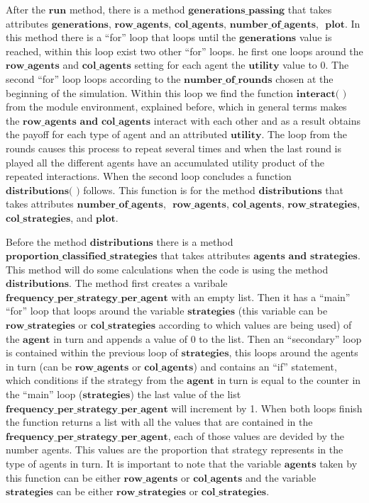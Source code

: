 \documentclass{article}
\begin{document}
After the $\textbf{run}$ method, there is a method $\textbf{generations\_passing}$ that takes attributes $\textbf{generations}$,  $\textbf{row\_agents}$, $\textbf{col\_agents}$, $\textbf{number\_of\_agents}$, $\textbf{ plot}$. In this method there is a ``for'' loop that loops until the $\textbf{generations}$ value is reached, within this loop exist two other ``for'' loops.
 he first one loops around the $\textbf{row\_agents}$ and  $\textbf{col\_agents}$ setting for each agent  the $\textbf{utility}$ value to 0. 
The second ``for'' loop loops according to the $\textbf{number\_of\_rounds}$ chosen at the beginning of the simulation. Within this loop we find the function $\textbf{interact( )}$ from the module environment, explained before, which in general terms makes the $\textbf{row\_agents and col\_agents}$ interact with each other and as a result obtains the payoff for each type of agent and an attributed $\textbf{utility}$. The loop from the rounds causes this process to repeat several times and when the last round is played all the different agents have an accumulated utility product of the repeated interactions.
When the second loop concludes a function $\textbf{distributions( )}$ follows. This function is for the method $\textbf{distributions}$ that takes attributes $\textbf{number\_of\_agents}$, $\textbf{ row\_agents}$, $\textbf{col\_agents}$, $\textbf{row\_strategies}$, $\textbf{col\_strategies}$, and$\textbf{ plot}$.

Before the method $\textbf{distributions}$ there is a method $\textbf{proportion\_classified\_strategies}$ that takes attributes $\textbf{agents and strategies}$. This method will do some calculations when the code is using the method $\textbf{distributions}$.   The method first creates a varibale $\textbf{frequency\_per\_strategy\_per\_agent}$ with an empty list. Then it has a ``main'' ``for'' loop that loops around the variable $\textbf{strategies}$ (this variable can be $\textbf{row\_strategies}$ or $\textbf{col\_strategies}$ according to which values are being used) of the $\textbf{agent}$ in turn and appends a value of 0 to the list. Then an ``secondary'' loop is contained within the previous loop of $\textbf{strategies}$, this loops around the agents in turn (can be $\textbf{row\_agents}$ or $\textbf{col\_agents}$) and contains an ``if'' statement, which conditions if  the strategy from the $\textbf{agent}$ in turn is equal to the counter in the ``main'' loop ($\textbf{strategies}$) the last value of the list $\textbf{frequency\_per\_strategy\_per\_agent}$ will increment by 1. When both loops finish the function returns a list with all the values that are contained in the $\textbf{frequency\_per\_strategy\_per\_agent}$, each of those values are devided by the number agents. This values are the proportion that strategy represents in the type of agents in turn. It is important to note that the variable $\textbf{agents}$ taken by this function can be either $\textbf{row\_agents}$ or $\textbf{col\_agents}$   and the variable $\textbf{strategies}$ can be either $\textbf{row\_strategies}$ or $\textbf{col\_strategies}$. 
\end{document}
